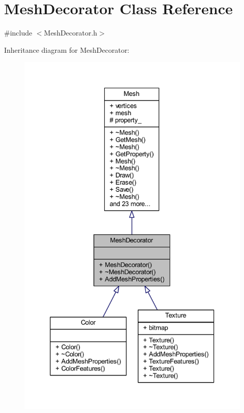 \hypertarget{class_mesh_decorator}{}\section{Mesh\+Decorator Class Reference}
\label{class_mesh_decorator}


{\ttfamily \#include $<$Mesh\+Decorator.\+h$>$}



Inheritance diagram for Mesh\+Decorator\+:
\nopagebreak
\begin{figure}[H]
\begin{center}
\leavevmode
\includegraphics[width=332pt]{class_mesh_decorator__inherit__graph}
\end{center}
\end{figure}


